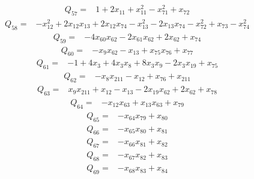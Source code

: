 \documentclass[11pt]{article}
\theoremstyle{definition}\newtheorem{definition}[theorem]{Definition}
\begin{document}
{%
\begin{align*}
 Q_{57}={}&1 +2x_{11} +x_{11}^{2} -x_{71}^{2} +x_{72}
\end{align*}
\begin{align*}
 Q_{58}={}&-x_{12}^{2} +2x_{12}x_{13} +2x_{12}x_{74} -x_{13}^{2} -2x_{13}x_{74} -x_{72}^{2} +x_{73} -x_{74}^{2}
\end{align*}
\begin{align*}
 Q_{59}={}&-4x_{60}x_{62} -2x_{61}x_{62} +2x_{62} +x_{74}
\end{align*}
\begin{align*}
 Q_{60}={}&-x_{9}x_{62} -x_{13} +x_{75}x_{76} +x_{77}
\end{align*}
\begin{align*}
 Q_{61}={}&-1 +4x_{3} +4x_{3}x_{8} +8x_{3}x_{9} -2x_{3}x_{19} +x_{75}
\end{align*}
\begin{align*}
 Q_{62}={}&-x_{8}x_{211} -x_{12} +x_{76} +x_{211}
\end{align*}
\begin{align*}
 Q_{63}={}&x_{9}x_{211} +x_{12} -x_{13} -2x_{19}x_{62} +2x_{62} +x_{78}
\end{align*}
\begin{align*}
 Q_{64}={}&-x_{12}x_{63} +x_{13}x_{63} +x_{79}
\end{align*}
\begin{align*}
 Q_{65}={}&-x_{64}x_{79} +x_{80}
\end{align*}
\begin{align*}
 Q_{66}={}&-x_{65}x_{80} +x_{81}
\end{align*}
\begin{align*}
 Q_{67}={}&-x_{66}x_{81} +x_{82}
\end{align*}
\begin{align*}
 Q_{68}={}&-x_{67}x_{82} +x_{83}
\end{align*}
\begin{align*}
 Q_{69}={}&-x_{68}x_{83} +x_{84}
\end{align*}
}
\end{document}

